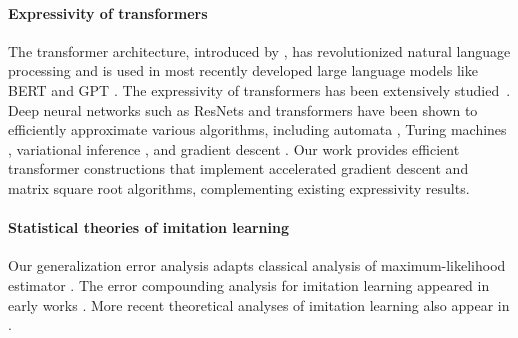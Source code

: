 \paragraph{Expressivity of transformers} The transformer architecture, introduced by \cite{vaswani2017attention}, has revolutionized natural language processing and is used in most recently developed large language models like BERT and GPT \citep{devlin2018bert, brown2020language}. The expressivity of transformers has been extensively studied~\citep{yun2019transformers, perez2019turing, hron2020infinite,yao2021self, bhattamishra2020computational, zhang2022unveiling, liu2022transformers, wei2022statistically, fu2023can, bai2023transformers, akyurek2022learning, von2023transformers}. Deep neural networks such as ResNets and transformers have been shown to efficiently approximate various algorithms, including automata \citep{liu2022transformers}, Turing machines \citep{wei2022statistically}, variational inference \citep{mei2023deep}, and gradient descent \citep{bai2023transformers, akyurek2022learning, von2023transformers}. Our work provides efficient transformer constructions that implement accelerated gradient descent and matrix square root algorithms, complementing existing expressivity results.





\paragraph{Statistical theories of imitation learning} Our generalization error analysis adapts classical analysis of maximum-likelihood estimator \citep{geer2000empirical}. The error compounding analysis for imitation learning appeared in early works \citep{ross2011reduction, ross2010efficient}. More recent theoretical analyses of imitation learning also appear in \cite{rajaraman2020toward, rajaraman2021provably, rashidinejad2021bridging}.









